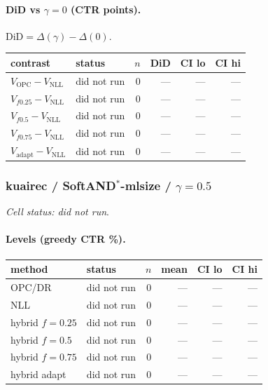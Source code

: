\documentclass[10pt,a4paper]{article}
\begin{document}
\paragraph{DiD vs $\gamma=0$ (CTR points).} $\mathrm{DiD}=\Delta(\gamma)-\Delta(0)$.
{\centering\small\begin{tabular}{llrrrr}
\toprule contrast & status & $n$ & DiD & CI lo & CI hi \\
\midrule
$V_{\mathrm{OPC}}-V_{\mathrm{NLL}}$ & did not run & 0 & --- & --- & --- \\
$V_{f0.25}-V_{\mathrm{NLL}}$ & did not run & 0 & --- & --- & --- \\
$V_{f0.5}-V_{\mathrm{NLL}}$ & did not run & 0 & --- & --- & --- \\
$V_{f0.75}-V_{\mathrm{NLL}}$ & did not run & 0 & --- & --- & --- \\
$V_{\mathrm{adapt}}-V_{\mathrm{NLL}}$ & did not run & 0 & --- & --- & --- \\
\bottomrule\end{tabular}\par}
\bigskip
\subsubsection{kuairec / SoftAND$^*$-mlsize / $\gamma=0.5$}
\emph{Cell status: did not run}.
\paragraph{Levels (greedy CTR \%).}
{\centering\small\begin{tabular}{llrrrr}
\toprule method & status & $n$ & mean & CI lo & CI hi \\
\midrule
OPC/DR & did not run & 0 & --- & --- & --- \\
NLL & did not run & 0 & --- & --- & --- \\
hybrid $f{=}0.25$ & did not run & 0 & --- & --- & --- \\
hybrid $f{=}0.5$ & did not run & 0 & --- & --- & --- \\
hybrid $f{=}0.75$ & did not run & 0 & --- & --- & --- \\
hybrid adapt & did not run & 0 & --- & --- & --- \\
\bottomrule\end{tabular}\par}
\end{document}
